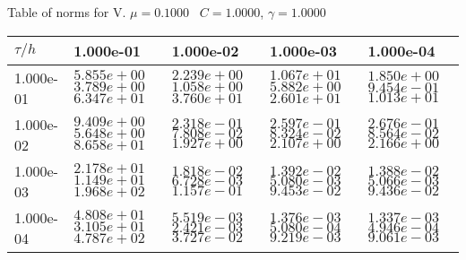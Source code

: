 \begin{center}
Table of norms for V. $\mu = 0.1000$ \, $C = 1.0000$, $\gamma = 1.0000$
  
\begin{tabular}{|p{1in}|p{1in}|p{1in}|p{1in}|p{1in}|} \hline
$\tau / h$ &1.000e-01 &1.000e-02 &1.000e-03 &1.000e-04 \\ \hline 
1.000e-01 & $5.855e+00$  $3.789e+00$  $6.347e+01$  & $2.239e+00$  $1.058e+00$  $3.760e+01$  & $1.067e+01$  $5.882e+00$  $2.601e+01$  & $1.850e+00$  $9.454e-01$  $1.013e+01$  \\ \hline 
1.000e-02 & $9.409e+00$  $5.648e+00$  $8.658e+01$  & $2.318e-01$  $7.808e-02$  $1.927e+00$  & $2.597e-01$  $8.324e-02$  $2.107e+00$  & $2.676e-01$  $8.564e-02$  $2.166e+00$  \\ \hline 
1.000e-03 & $2.178e+01$  $1.149e+01$  $1.968e+02$  & $1.818e-02$  $6.728e-03$  $1.157e-01$  & $1.392e-02$  $5.080e-03$  $9.453e-02$  & $1.388e-02$  $5.066e-03$  $9.436e-02$  \\ \hline 
1.000e-04 & $4.808e+01$  $3.105e+01$  $4.787e+02$  & $5.519e-03$  $2.421e-03$  $3.727e-02$  & $1.376e-03$  $5.080e-04$  $9.219e-03$  & $1.337e-03$  $4.946e-04$  $9.061e-03$  \\ \hline 

\end{tabular}\\[20pt]
\end{center}
